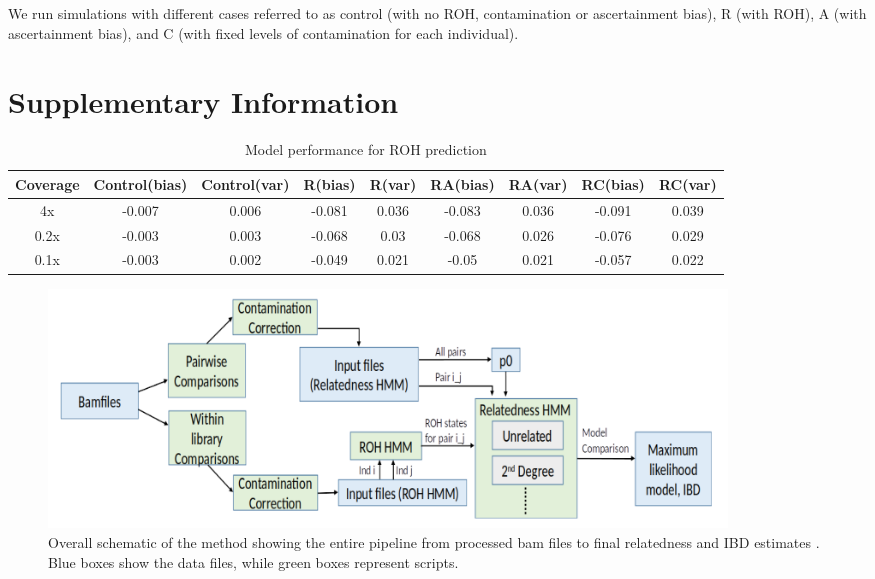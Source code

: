 \documentclass[12pt, letterpaper]{article}
\begin{document}
We run simulations with different cases referred to as control (with no ROH, contamination or ascertainment bias), R (with ROH), A (with ascertainment bias), and C (with fixed levels of contamination for each individual). 

\section{Supplementary Information}



\begin{table}
\caption{\label{tab:Table 2}Model performance for ROH prediction}
\begin{tabular}{|c|c|c|c|c|c|c|c|c|}
    \hline
    Coverage & Control(bias) & Control(var) & R(bias) & R(var) & RA(bias) & RA(var) & RC(bias) & RC(var)\\
    \hline
    4x & -0.007 & 0.006 & -0.081 & 0.036 & -0.083 & 0.036 & -0.091 & 0.039\\
    \hline
    0.2x & -0.003 & 0.003 & -0.068 & 0.03 & -0.068 & 0.026 & -0.076 & 0.029\\
    \hline
    0.1x & -0.003 & 0.002 & -0.049 & 0.021 & -0.05 & 0.021 & -0.057 & 0.022\\
    \hline
\end{tabular}
\label{table1}
\end{table}

\renewcommand{\figurename}{Fig. S}
\begin{figure}[h!]
    \includegraphics[width=18cm]{plots/inkscape_finalImg/schematic_sup.png}
    \centering
    \caption{Overall schematic of the method showing the entire pipeline from processed bam files to final relatedness and IBD estimates . Blue boxes show the data files, while green boxes represent scripts.}
    \label{figS0:schematic}
\end{figure}
\end{document}

